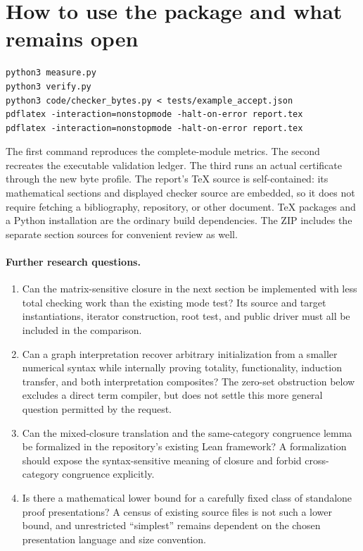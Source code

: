 \documentclass[11pt,letterpaper]{article}
\theoremstyle{definition}
\theoremstyle{remark}
\begin{document}
\section{How to use the package and what remains open}

\begin{lstlisting}
python3 measure.py
python3 verify.py
python3 code/checker_bytes.py < tests/example_accept.json
pdflatex -interaction=nonstopmode -halt-on-error report.tex
pdflatex -interaction=nonstopmode -halt-on-error report.tex
\end{lstlisting}

The first command reproduces the complete-module metrics. The second
recreates the executable validation ledger. The third runs an actual
certificate through the new byte profile. The report's TeX source is
self-contained: its mathematical sections and displayed checker source
are embedded, so it does not require fetching a bibliography, repository,
or other document. TeX packages and a Python installation are the ordinary
build dependencies. The ZIP includes the separate section sources for
convenient review as well.

\paragraph{Further research questions.}
\begin{enumerate}
\item Can the matrix-sensitive closure in the next section be implemented
with less total checking work than the existing mode test? Its source
and target instantiations, iterator construction, root test, and public
driver must all be included in the comparison.
\item Can a graph interpretation recover arbitrary initialization from
a smaller numerical syntax while internally proving totality,
functionality, induction transfer, and both interpretation composites?
The zero-set obstruction below excludes a direct term compiler, but
does not settle this more general question permitted by the request.
\item Can the mixed-closure translation and the same-category congruence
lemma be formalized in the repository's existing Lean framework? A
formalization should expose the syntax-sensitive meaning of closure
and forbid cross-category congruence explicitly.
\item Is there a mathematical lower bound for a carefully fixed class
of standalone proof presentations? A census of existing source files
is not such a lower bound, and unrestricted ``simplest'' remains
dependent on the chosen presentation language and size convention.
\end{enumerate}
\end{document}
